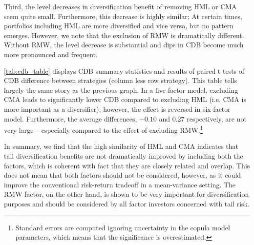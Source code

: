 Third, the level decreases in diversification benefit of removing HML or CMA seem quite small. Furthermore, this decrease is highly similar; At certain times, portfolios including HML are more diversified and vice versa, but no pattern emerges. However, we note that the exclusion of RMW is dramatically different. Without RMW, the level decrease is substantial and dips in CDB become much more pronounced and frequent. 

\autoref{tab:cdb_table} displays CDB summary statistics and results of paired t-tests of CDB difference between strategies (column less row strategy). This table tells largely the same story as the previous graph. In a five-factor model, excluding CMA leads to significantly lower CDB compared to excluding HML (i.e. CMA is more important as a diversifier), however, the effect is reversed in six-factor model. Furthermore, the average differences, $-0.10$ and $0.27$ respectively, are not very large -- especially compared to the effect of excluding RMW.\footnote{Standard errors are computed ignoring uncertainty in the copula model parameters, which means that the significance is overestimated.}


In summary, we find that the high similarity of HML and CMA indicates that tail diversification benefits are not dramatically improved by including both the factors, which is coherent with fact that they are closely related and overlap. This does not mean that both factors should not be considered, however, as it could improve the conventional risk-return tradeoff in a mean-variance setting. The RMW factor, on the other hand, is shown to be very important for diversification purposes and should be considered by all factor investors concerned with tail risk.







